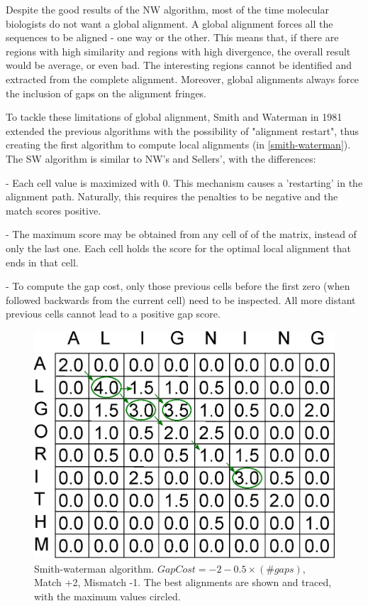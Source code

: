 Despite the good results of the \ac{NW} algorithm, most of the time molecular biologists do not want a global alignment. A global alignment forces all the sequences to be aligned - one way or the other. This means that, if there are regions with high similarity and regions with high divergence, the overall result would be average, or even bad. The interesting regions cannot be identified and extracted from the complete alignment. Moreover, global alignments always force the inclusion of gaps on the alignment fringes.

To tackle these limitations of global alignment, Smith and Waterman in 1981 \cite{smithwaterman} extended the previous algorithms with the possibility of "alignment restart", thus creating the first algorithm to compute local alignments (in \autoref{smith-waterman}). The \ac{SW} algorithm is similar to \ac{NW}'s and Sellers', with the differences:

	- Each cell value is maximized with 0. This mechanism causes a 'restarting' in the alignment path. Naturally, this requires the penalties to be negative and the match scores positive.

	- The maximum score may be obtained from any cell of of the matrix, instead of only the last one. Each cell holds the score for the optimal local alignment that ends in that cell.

	- To compute the gap cost, only those previous cells before the first zero (when followed backwards from the current cell) need to be inspected. All more distant previous cells cannot lead to a positive gap score.

\begin{figure}[htb!]
\centering
\includegraphics[scale=0.5]{img-align/smith-waterman.eps}
\caption[Smith-Waterman alignment] {Smith-waterman algorithm. $GapCost = -2 -0.5 \times (\#gaps)$, Match +2, Mismatch -1. The best alignments are shown and traced, with the maximum values circled.}
\label{smith-waterman}
\end{figure}


